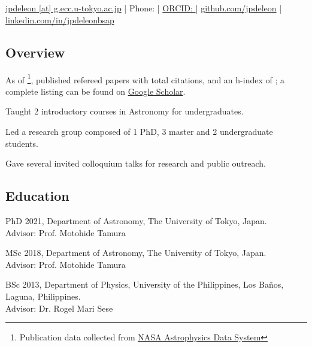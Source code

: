 \documentclass[12pt,letterpaper]{article}
\begin{document}
\thispagestyle{empty}\sloppy\sloppypar\raggedbottom

\textbf{\Large \fullname} \\[0.5ex]
\currentposition \\
\textsf{\small 
    \href{mailto:\email}{jpdeleon [at] g.ecc.u-tokyo.ac.jp} | %
    Phone: {\phonenumber} | %
    \href{\orcidurl}{ORCID: \orcid} | %
    \href{\githuburl}{github.com/jpdeleon} | %
    \href{\linkedinurl}{linkedin.com/in/jpdeleonbsap}
}\\[0.5ex]

\subsection{Overview}
\begin{list}{}{\cvlist}
    \item As of \pubsdate\footnote{Publication data collected from \href{https://ui.adsabs.harvard.edu/}{NASA Astrophysics Data System}}, published \pubsnumber refereed papers with \pubscitations total citations, and an h-index of \pubshindex; a complete listing can be found on \href{\scholarurl}{Google Scholar}.
    \item Taught 2 introductory courses in Astronomy for undergraduates. 
    \item Led a research group composed of 1 PhD, 3 master and 2 undergraduate students. 
    \item Gave several invited colloquium talks for research and public outreach.
\end{list}

\subsection{Education}
\begin{list}{}{\cvlist}
  \item
        PhD 2021, Department of Astronomy, The University of Tokyo, Japan.\\Advisor: Prof. Motohide Tamura
  \item
        MSc 2018, Department of Astronomy, The University of Tokyo, Japan.\\Advisor: Prof. Motohide Tamura
  \item
        BSc 2013, Department of Physics, University of the Philippines, Los Ba\~nos, Laguna, Philippines.\\Advisor: Dr. Rogel Mari Sese      
\end{list}
\end{document}
